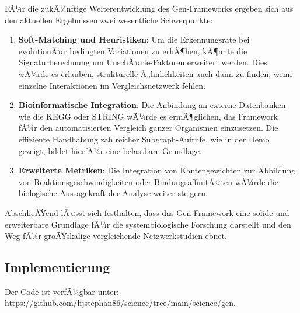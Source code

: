 ﻿\documentclass[a4paper,12pt]{article}
\theoremstyle{definition}
\begin{document}
FÃ¼r die zukÃ¼nftige Weiterentwicklung des Gen-Frameworks ergeben sich aus den aktuellen Ergebnissen zwei wesentliche Schwerpunkte:

\begin{enumerate}
	\item \textbf{Soft-Matching und Heuristiken}: Um die Erkennungsrate bei evolutionÃ¤r bedingten Variationen zu erhÃ¶hen, kÃ¶nnte die Signaturberechnung um UnschÃ¤rfe-Faktoren erweitert werden. Dies wÃ¼rde es erlauben, strukturelle Ã„hnlichkeiten auch dann zu finden, wenn einzelne Interaktionen im Vergleichsnetzwerk fehlen.
	\item \textbf{Bioinformatische Integration}: Die Anbindung an externe Datenbanken wie die KEGG oder STRING wÃ¼rde es ermÃ¶glichen, das Framework fÃ¼r den automatisierten Vergleich ganzer Organismen einzusetzen. Die effiziente Handhabung zahlreicher Subgraph-Aufrufe, wie in der Demo gezeigt, bildet hierfÃ¼r eine belastbare Grundlage.
	\item \textbf{Erweiterte Metriken}: Die Integration von Kantengewichten zur Abbildung von Reaktionsgeschwindigkeiten oder BindungsaffinitÃ¤ten wÃ¼rde die biologische Aussagekraft der Analyse weiter steigern.
\end{enumerate}

AbschlieÃŸend lÃ¤sst sich festhalten, dass das Gen-Framework eine solide und erweiterbare Grundlage fÃ¼r die systembiologische Forschung darstellt und den Weg fÃ¼r groÃŸskalige vergleichende Netzwerkstudien ebnet.

\subsection{Implementierung}

Der Code ist verfÃ¼gbar unter: \url{https://github.com/hjstephan86/science/tree/main/science/gen}.
\end{document}
